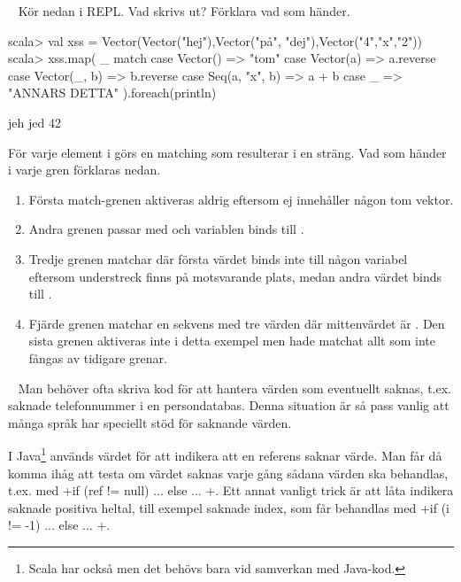 \QUESTEND






\QUESTBEGIN

\Task \what ~ Kör nedan i REPL. Vad skrivs ut? Förklara vad som händer.
\begin{REPL}
scala> val xss = Vector(Vector("hej"),Vector("på", "dej"),Vector("4","x","2"))
scala> xss.map( _ match
  case Vector() => "tom"
  case Vector(a) => a.reverse
  case Vector(_, b) => b.reverse
  case Seq(a, "x", b) => a + b
  case _ => "ANNARS DETTA"
  ).foreach(println)
\end{REPL}


\SOLUTION

\TaskSolved \what

\begin{REPL}
jeh
jed
42
\end{REPL}
För varje element i  görs en matching som resulterar i en sträng. Vad som händer i varje gren förklaras nedan.
\begin{enumerate}
  \item Första match-grenen aktiveras aldrig eftersom  ej innehåller någon tom vektor.
  \item Andra grenen passar med  och variablen  binds till .
  \item Tredje grenen matchar  där första värdet binds inte till någon variabel eftersom understreck finns på motsvarande plats, medan andra värdet binds till .
  \item Fjärde grenen matchar en sekvens med tre värden där mittenvärdet är . Den sista grenen aktiveras inte i detta exempel men hade matchat allt som inte fångas av tidigare grenar.
\end{enumerate}

\QUESTEND





\QUESTBEGIN

\Task  \what~  Man behöver ofta skriva kod för att hantera värden som eventuellt saknas, t.ex. saknade telefonnummer i en persondatabas. Denna situation är så pass vanlig att många språk har speciellt stöd för saknande värden.

I Java\footnote{Scala har också  men det behövs bara vid samverkan med Java-kod.} används värdet  för att indikera att en referens saknar värde. Man får då komma ihåg att testa om värdet saknas varje gång sådana värden ska behandlas, t.ex. med \code+if (ref != null) { ...} else { ... }+. Ett annat vanligt trick är att låta  indikera saknade positiva heltal, till exempel saknade index, som får behandlas med \code+if (i != -1) { ...} else { ... }+.

